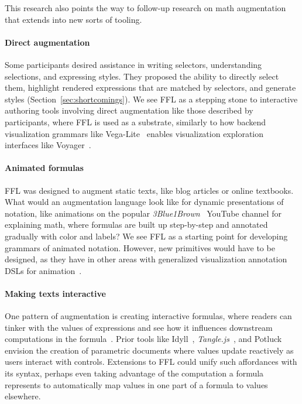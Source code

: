 This research also points the way to follow-up research on math augmentation that extends into new sorts of tooling.

\paragraph{Direct augmentation}
Some participants desired assistance in writing selectors, understanding selections, and expressing styles. They proposed the ability to directly select them, highlight rendered expressions that are matched by selectors, and generate styles (Section~\ref{sec:shortcomings}). We see FFL as a stepping stone to interactive authoring tools involving direct augmentation like those described by participants, where FFL is used as a substrate, similarly to how backend visualization grammars like Vega-Lite~\cite{ref:satyanarayan2017vegalite} enables visualization exploration interfaces like Voyager~\cite{ref:wongsuphasawat2015voyager}. 

\paragraph{Animated formulas}
FFL was designed to augment static texts, like blog articles or online textbooks. What would an augmentation language look like for dynamic presentations of notation, like animations on the popular \emph{3Blue1Brown}~\cite{ref:3Blue1Brown} YouTube channel for explaining math, where formulas are built up step-by-step and annotated gradually with color and labels? We see FFL as a starting point for developing grammars of animated notation. However, new primitives would have to be designed, as they have in other areas with generalized visualization annotation DSLs for animation~\cite{ref:ge2020canis}.

\paragraph{Making texts interactive}
One pattern of augmentation is creating interactive formulas, where readers can tinker with the values of expressions and see how it influences downstream computations in the formula~\cite{ref:head2022math}.
Prior tools like Idyll~\cite{ref:conlen2018idyll}, \emph{Tangle.js}~\cite{tool:victortangle}, and Potluck~\cite{ref:litt2022potluck} envision the creation of parametric documents where values update reactively as users interact with controls. Extensions to FFL could unify such affordances with its syntax, perhaps even taking advantage of the computation a formula represents to automatically map values in one part of a formula to values elsewhere.

